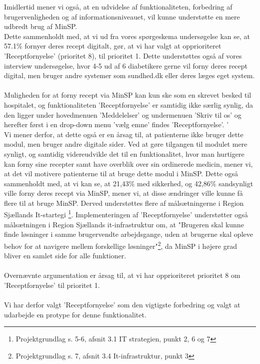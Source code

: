 Imidlertid mener vi også, at en udvidelse af funktionaliteten, forbedring af brugervenligheden og af informationsniveauet, vil kunne understøtte en mere udbredt brug af MinSP.\\
Dette sammenholdt med, at vi ud fra vores spørgeskema undersøgelse kan se, at 57.1\% fornyer deres recept digitalt, gør, at vi har valgt at opprioriteret 'Receptfornyelse' (prioritet 8), til prioritet 1. Dette understøttes også af vores interview undersøgelse, hvor 4-5 ud af 6 diabetikere gerne vil forny deres recept digital, men bruger andre systemer som sundhed.dk eller deres læges eget system.
\\\\
Muligheden for at forny recept via MinSP kan kun ske som en skrevet besked til hospitalet, og funktionaliteten 'Receptfornyelse' er samtidig ikke særlig synlig, da den ligger under hovedmenuen 'Meddelelser' og undermenuen 'Skriv til os' og herefter først i en drop-down menu 'vælg emne' findes 'Receptfornyelse'. '\\
Vi mener derfor, at dette også er en årsag til, at patienterne ikke bruger dette modul, men bruger andre digitale sider. Ved at gøre tilgangen til modulet mere synligt, og samtidig videreudvikle det til en funktionalitet, hvor man hurtigere kan forny sine recepter samt have overblik over sin ordinerede medicin, mener vi, at det vil motivere patienterne til at bruge dette modul i MinSP. Dette også sammenholdt med, at vi kan se, at 21,43\% med sikkerhed, og 42,86\% sandsynligt ville forny deres recept via MinSP, mener vi, at disse ændringer ville kunne få flere til at bruge MinSP. Derved understøttes flere af målsætningerne i Region Sjællands It-startegi \footnote{Projektgrundlag s. 5-6, afsnit 3.1 IT strategien, punkt 2, 6 og 7}. Implementeringen af 'Receptfornyelse' understøtter også målsætningen i Region Sjællands it-infrastruktur om, at "Brugeren skal kunne finde løsninger i samme brugervendte arbejdsgange, uden at brugerne skal opleve behov for at navigere mellem forskellige løsninger"\footnote{Projektgrundlag s. 7, afsnit 3.4 It-infrastruktur, punkt 3}, da MinSP i højere grad bliver en samlet side for alle funktioner. 
\\ \\
Overnævnte argumentation er årsag til, at vi har opprioriteret prioritet 8 om 'Receptfornyelse' til prioritet 1. 
\\\\
Vi har derfor valgt 'Receptfornyelse' som den vigtigste forbedring og valgt at udarbejde en protype for denne funktionalitet.